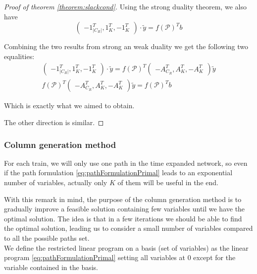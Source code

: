 \documentclass[14pt,a4paper]{article}
\theoremstyle{definition}
\numberwithin{equation}{subsection}
\begin{document}
\begin{proof}[Proof of theorem \ref{theorem:slackcond}]
 Using the strong duality theorem, we also have 
 $$\left( \begin{matrix} -1_{|C_R|}^T, 1_K^T, -1_K^T  \end{matrix} \right)\cdot \tilde{y} =  f(\mathcal{P})^Tb  $$

Combining the two results from strong an weak duality we get the following two equalities:
\begin{align*}
\left( \begin{matrix} -1_{|C_R|}^T, 1_K^T, -1_K^T  \end{matrix} \right)\cdot \tilde{y} = 
f(\mathcal{P})^T \left( \begin{matrix} -A_{C_R}^T, A_K^T, -A_K^T \end{matrix} \right)\tilde{y} \\
f(\mathcal{P})^T \left( \begin{matrix} -A_{C_R}^T, A_K^T, -A_K^T \end{matrix} \right)\tilde{y} =  f(\mathcal{P})^Tb 
\end{align*}

Which is exactly what we aimed to obtain.

The other direction is similar.

	 
	 
\end{proof}
\subsubsection{Column generation method}

For each train, we will only use one path in the time expanded network, so even if the path formulation \eqref{eq:pathFormulationPrimal} leads to an exponential number of variables, actually only $K$ of them will be useful in the end. 

With this remark in mind, the purpose of the column generation method is to gradually improve a feasible solution containing few variables until we have the optimal solution. The idea is that in a few iterations we should be able to find the optimal solution, leading us to consider a small number of variables compared to all the possible paths set.
\\

We define the restricted linear program on a basis (set of variables) as the linear program \eqref{eq:pathFormulationPrimal} setting all variables at $0$ except for the variable contained in the basis.\\
\end{document}
